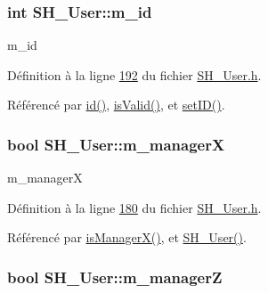 \hypertarget{classSH__User_a701e1d1238c488e46e8d1dcc7dbe8dc0}{
\subsubsection[{m\-\_\-id}]{\setlength{\rightskip}{0pt plus 5cm}int S\-H\-\_\-\-User\-::m\-\_\-id\hspace{0.3cm}{\ttfamily [private]}}}\label{classSH__User_a701e1d1238c488e46e8d1dcc7dbe8dc0}


m\-\_\-id 



Définition à la ligne \hyperlink{SH__User_8h_source_l00192}{192} du fichier \hyperlink{SH__User_8h_source}{S\-H\-\_\-\-User.\-h}.



Référencé par \hyperlink{classSH__User_addf3cb1d491eea2df592dee5c9081d32}{id()}, \hyperlink{classSH__User_a07de5c02b2a02b3bb2b0aaf0886bb4d9}{is\-Valid()}, et \hyperlink{classSH__User_ad3195a7010669a0d007cf95606562eb3}{set\-I\-D()}.

\hypertarget{classSH__User_ab9c9475b85e1449da1476eb7b4157a4d}{
\subsubsection[{m\-\_\-manager\-X}]{\setlength{\rightskip}{0pt plus 5cm}bool S\-H\-\_\-\-User\-::m\-\_\-manager\-X\hspace{0.3cm}{\ttfamily [private]}}}\label{classSH__User_ab9c9475b85e1449da1476eb7b4157a4d}


m\-\_\-manager\-X 



Définition à la ligne \hyperlink{SH__User_8h_source_l00180}{180} du fichier \hyperlink{SH__User_8h_source}{S\-H\-\_\-\-User.\-h}.



Référencé par \hyperlink{classSH__User_af5e5639aa5f7794b5b169f0ed0333268}{is\-Manager\-X()}, et \hyperlink{classSH__User_a96c0ebb3f11c1654935aaecb92295724}{S\-H\-\_\-\-User()}.

\hypertarget{classSH__User_aff16f3d1a135c4b6673b69c42cffe86d}{
\subsubsection[{m\-\_\-manager\-Z}]{\setlength{\rightskip}{0pt plus 5cm}bool S\-H\-\_\-\-User\-::m\-\_\-manager\-Z\hspace{0.3cm}{\ttfamily [private]}}}\label{classSH__User_aff16f3d1a135c4b6673b69c42cffe86d}



